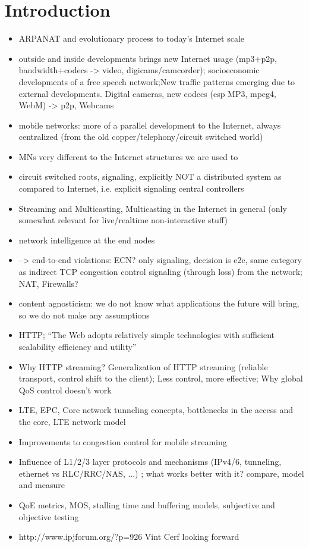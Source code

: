 \chapter{Introduction}
\label{chap:intro}


\begin{itemize}

\item ARPANAT and evolutionary process to today's Internet scale
\item outside and inside developments brings new Internet usage (mp3+p2p, bandwidth+codecs -> video, digicams/camcorder); socioeconomic developments of a free speech network;New traffic patterns emerging due to external developments. Digital cameras, new codecs (esp MP3, mpeg4, WebM) -> p2p, Webcams 
\item mobile networks: more of a parallel development to the Internet, always centralized (from the old copper/telephony/circuit switched world)
\item MNs very different to the Internet structures we are used to
\item circuit switched roots, signaling, explicitly NOT a distributed system as compared to Internet, i.e. explicit signaling central controllers
\item Streaming and Multicasting, Multicasting in the Internet in general (only somewhat relevant for live/realtime non-interactive stuff)
\item  network intelligence at the end nodes
\item --> end-to-end violations: ECN? only signaling, decision is e2e, same category as indirect TCP congestion control signaling (through loss) from the network; NAT, Firewalls?
\item content agnosticism: we do not know what applications the future will bring, so we do not make any assumptions
\item HTTP; ``The Web adopts relatively simple technologies with sufficient scalability efficiency and utility'' \cite{W3Arch}
\item Why HTTP streaming? Generalization of HTTP streaming (reliable transport, control shift to the client); Less control, more effective; Why global QoS control doesn't work
\item LTE, EPC, Core network tunneling concepts, bottlenecks in the access and the core, LTE network model
\item Improvements to congestion control for mobile streaming
\item Influence of L1/2/3 layer protocols and mechanisms (IPv4/6, tunneling, ethernet vs RLC/RRC/NAS, ...) ; what works better with it? compare, model and measure
\item QoE metrics, MOS, stalling time and buffering models, subjective and objective testing
\item http://www.ipjforum.org/?p=926 Vint Cerf looking forward
\end{itemize}

